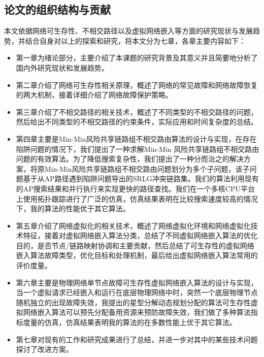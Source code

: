 \subsection{论文的组织结构与贡献}
本文依据网络可生存性、不相交路径以及虚拟网络嵌入等方面的研究现状与发展趋势，并结合自身对以上的探索和研究，将本文分为七章，各章主要内容如下：
\begin{itemize}
  \item 第一章为绪论部分，主要介绍了本课题的研究背景及其意义并且简要地分析了国内外研究现状和发展趋势。
  \item 第二章介绍了网络可生存性相关原理，概述了网络的常见故障和网络故障恢复的两大机制，接着详细介绍了网络故障保护策略。
  \item 第三章介绍了不相交路径的相关技术，概述了不同类型的不相交路径的问题，然后给出不同类型的不相交路径的约束条件，实际应用和时间复杂度的总结。
  \item 第四章主要是Min-Min风险共享链路组不相交路由算法的设计与实现，在存在陷阱问题的情况下，我们提出了一种求解Min-Min 风险共享链路组不相交路由问题的有效算法。为了降低搜索复杂性，我们提出了一种分而治之的解决方案，将原Min-Min风险共享链路组不相交路由问题划分为多个子问题，该子问题基于从AP路径遇到陷阱问题导出的SRLG冲突链路集。我们的算法利用现有的AP搜索结果和并行执行来实现更快的路径查找。我们在一个多核CPU平台上使用拓扑跟踪进行了广泛的仿真，仿真结果表明在比较搜索速度较高的情况下，我的算法的性能优于其它算法。
  \item 第五章介绍了网络虚拟化的相关技术，概述了网络虚拟化环境和网络虚拟化技术特征，接着对虚拟网络嵌入算法分类，总结了不同虚拟网络嵌入算法的优化目的，是否节点/链路映射协调和主要贡献，然后总结了可生存性的虚拟网络嵌入算法故障类型，优化目标和处理机制，最后给出虚拟网络嵌入算法常用的评价度量。
  \item 第六章主要是物理网络单节点故障可生存性虚拟网络嵌入算法的设计与实现，当一个虚拟请求已经嵌入和运行在底层物理网络中时，突然一个底层物理节点随机独立的出现故障失效，我提出的星型分解动态规划分配的算法可生存性虚拟网络嵌入算法可以预先分配备用资源来预防故障失效，我们做了多种算法指标度量的仿真，仿真结果表明我的算法的在多数性能上优于其它算法。
  \item 第七章对现有的工作和研究成果进行了总结，并进一步对其中的某些技术问题探讨了改进方案。
\end{itemize}
